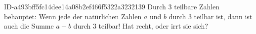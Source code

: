 \begin{exercise}
      {ID-a493bff5fc14dee14a08b2ef466f5322a3232139}
      {Durch 3 teilbare Zahlen}
  \ifproblem\problem
    \xxb{} behauptet: \glqq Wenn jede der natürlichen Zahlen $a$ und $b$ durch 3
    teilbar ist, dann ist auch die Summe $a+b$ durch 3 teilbar!\grqq{} Hat \xxb{}
    recht, oder irrt sie sich?
  \fi
\end{exercise}
